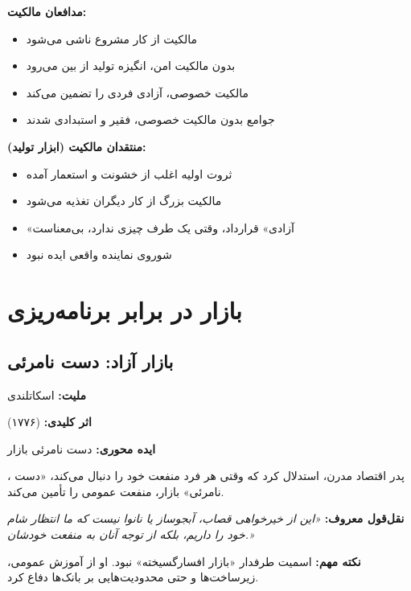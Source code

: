 \begin{debatebox}
\textbf{مدافعان مالکیت:}
\begin{itemize}[nosep]
    \item مالکیت از کار مشروع ناشی می‌شود
    \item بدون مالکیت امن، انگیزه تولید از بین می‌رود
    \item مالکیت خصوصی، آزادی فردی را تضمین می‌کند
    \item جوامع بدون مالکیت خصوصی، فقیر و استبدادی شدند
\end{itemize}

\textbf{منتقدان مالکیت (ابزار تولید):}
\begin{itemize}[nosep]
    \item ثروت اولیه اغلب از خشونت و استعمار آمده
    \item مالکیت بزرگ از کار دیگران تغذیه می‌شود
    \item «آزادی» قرارداد، وقتی یک طرف چیزی ندارد، بی‌معناست
    \item شوروی نماینده واقعی ایده نبود
\end{itemize}
\end{debatebox}

\section{بازار در برابر برنامه‌ریزی}

\subsection{بازار آزاد: دست نامرئی}

\begin{personbox}

\textbf{ملیت:} اسکاتلندی

\textbf{اثر کلیدی:}  (۱۷۷۶)

\textbf{ایده محوری:} دست نامرئی بازار

\mediumspace

، پدر اقتصاد مدرن، استدلال کرد که وقتی هر فرد منفعت خود را دنبال می‌کند، «دست نامرئی» بازار، منفعت عمومی را تأمین می‌کند.

\textbf{نقل‌قول معروف:} \textit{«این از خیرخواهی قصاب، آبجوساز یا نانوا نیست که ما انتظار شام خود را داریم، بلکه از توجه آنان به منفعت خودشان.»}

\mediumspace

\textbf{نکته مهم:} اسمیت طرفدار «بازار افسارگسیخته» نبود. او از آموزش عمومی، زیرساخت‌ها و حتی محدودیت‌هایی بر بانک‌ها دفاع کرد.
\end{personbox}

